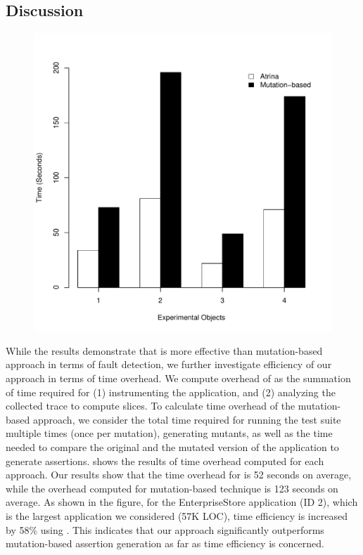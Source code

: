 \subsection{Discussion} \label{Sec:discussion}
\begin{figure}[!t]
  \centering
  \includegraphics[width=0.7\hsize]{r-scripts/performance}
  \vspace{-0.18in}   
  \vspace{-0.3in} 
  \label{Fig:performance}   
\end{figure}
 While the results demonstrate that \tool is more effective than mutation-based approach in terms of fault detection, we further investigate efficiency of our approach in terms of time overhead. 
We compute overhead of \tool as the summation of time required for (1) instrumenting the application, and (2) analyzing the collected trace to compute \javascript slices. To calculate time overhead of the mutation-based approach, we consider the total time required for running the test suite multiple times (once per mutation), generating mutants, as well as the time needed to compare the original and the mutated version of the application to generate assertions.  shows the results of time overhead computed for each approach.    
Our results show that the time overhead for \tool is 52 seconds on average, while the overhead computed for mutation-based technique is 123 seconds on average. As shown in the figure, for the EnterpriseStore application (ID 2), which is the largest application we considered (57K LOC), time efficiency is increased by 58\% using \tool. This indicates that our approach significantly outperforms mutation-based assertion generation as far as time efficiency is concerned. 
